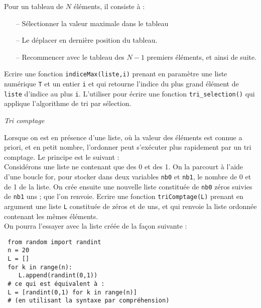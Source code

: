 Pour un tableau de $N$ éléments, il consiste à :
\begin{enumerate}
	\item[--] Sélectionner la valeur maximale dans le tableau
	\item[--] Le déplacer en dernière position du tableau.
	\item[--] Recommencer avec le tableau des $N-1$ premiers éléments, et ainsi de suite.
\end{enumerate}


\ques Ecrire une fonction \texttt{indiceMax(liste,i)} prenant en paramètre une liste numérique \texttt{T} et un entier \texttt{i} et qui retourne l'indice du plus grand élément de \texttt{liste} d'indice au plus \texttt{i}.
\ques L'utiliser pour écrire une fonction \texttt{tri\_selection()} qui applique l'algorithme de tri par sélection.

\exo
\textit{Tri comptage}

Lorsque on est en présence d'une liste, où la valeur des éléments est connue a priori, et en petit nombre, l'ordonner peut s'exécuter plus rapidement par un tri comptage. Le principe est le suivant :\\
Considérons une liste ne contenant que des 0 et des 1. On la parcourt à l'aide d'une boucle for, pour stocker dans deux variables \texttt{nb0} et \texttt{nb1}, le nombre de 0 et de 1 de la liste. On crée ensuite une nouvelle liste constituée de \texttt{nb0} zéros suivies de \texttt{nb1} uns ; que l'on renvoie.
\ques Ecrire une fonction \texttt{triComptage(L)} prenant en argument une liste \texttt{L} constituée de zéros et de uns,  et qui renvoie la liste ordonnée contenant les mêmes éléments.\\
On pourra l'essayer avec la liste créée de la façon suivante :
\begin{verbatim}
 from random import randint
 n = 20
 L = []
 for k in range(n):
 	L.append(randint(0,1))
 # ce qui est équivalent à :
 L = [randint(0,1) for k in range(n)]
 # (en utilisant la syntaxe par compréhension)
 \end{verbatim}

